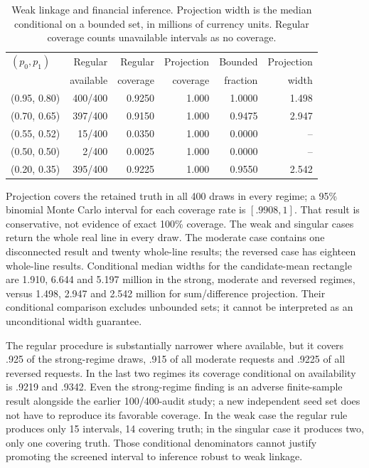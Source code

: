 \begin{table}[htbp]\centering\small
\caption{Weak linkage and financial inference. Projection width is the median
conditional on a bounded set, in millions of currency units. Regular coverage
counts unavailable intervals as no coverage.}
\label{s61:projection-results}
\begin{tabular}{lrrrrr}\toprule
$(p_0,p_1)$ & Regular & Regular & Projection & Bounded & Projection\\
 & available & coverage & coverage & fraction & width\\\midrule
(0.95, 0.80) & 400/400 & 0.9250 & 1.000 & 1.0000 & 1.498 \\
(0.70, 0.65) & 397/400 & 0.9150 & 1.000 & 0.9475 & 2.947 \\
(0.55, 0.52) & 15/400 & 0.0350 & 1.000 & 0.0000 & -- \\
(0.50, 0.50) & 2/400 & 0.0025 & 1.000 & 0.0000 & -- \\
(0.20, 0.35) & 395/400 & 0.9225 & 1.000 & 0.9550 & 2.542 \\
\bottomrule\end{tabular}
\end{table}

Projection covers the retained truth in all 400 draws in every regime; a
95\% binomial Monte Carlo interval for each coverage rate is $[.9908,1]$.
That result is conservative, not evidence of exact 100\% coverage. The weak
and singular cases return the whole real line in every draw. The moderate
case contains one disconnected result and twenty whole-line results; the
reversed case has eighteen whole-line results. Conditional median widths
for the candidate-mean rectangle are 1.910, 6.644 and 5.197 million in the
strong, moderate and reversed regimes, versus 1.498, 2.947 and 2.542 million
for sum/difference projection. Their conditional comparison excludes
unbounded sets; it cannot be interpreted as an unconditional width guarantee.

The regular procedure is substantially narrower where available, but it
covers .925 of the strong-regime draws, .915 of all moderate requests and
.9225 of all reversed requests. In the last two regimes its coverage
conditional on availability is .9219 and .9342. Even the strong-regime
finding is an adverse finite-sample result alongside the earlier
100/400-audit study; a new independent seed set does not have to reproduce
its favorable coverage. In the weak case the regular rule produces only
15 intervals, 14 covering truth; in the singular case it produces two,
only one covering truth. Those conditional denominators cannot justify
promoting the screened interval to inference robust to weak linkage.


